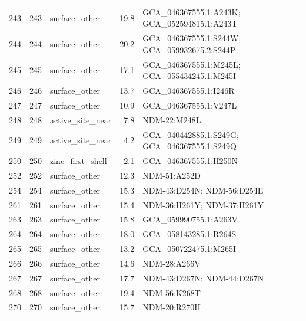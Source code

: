 \begin{longtable}{rrlrl}
243&243&surface\_other&19.8&GCA\_046367555.1:A243K; GCA\_052594815.1:A243T\\
244&244&surface\_other&20.2&GCA\_046367555.1:S244W; GCA\_059932675.2:S244P\\
245&245&surface\_other&17.1&GCA\_046367555.1:M245L; GCA\_055434245.1:M245I\\
246&246&surface\_other&13.7&GCA\_046367555.1:I246R\\
247&247&surface\_other&10.9&GCA\_046367555.1:V247L\\
248&248&active\_site\_near&7.8&NDM-22:M248L\\
249&249&active\_site\_near&4.2&GCA\_040442885.1:S249G; GCA\_046367555.1:S249Q\\
250&250&zinc\_first\_shell&2.1&GCA\_046367555.1:H250N\\
252&252&surface\_other&12.3&NDM-51:A252D\\
254&254&surface\_other&15.3&NDM-43:D254N; NDM-56:D254E\\
261&261&surface\_other&15.4&NDM-36:H261Y; NDM-37:H261Y\\
263&263&surface\_other&15.8&GCA\_059990755.1:A263V\\
264&264&surface\_other&18.0&GCA\_058143285.1:R264S\\
265&265&surface\_other&13.2&GCA\_050722475.1:M265I\\
266&266&surface\_other&14.6&NDM-28:A266V\\
267&267&surface\_other&17.7&NDM-43:D267N; NDM-44:D267N\\
268&268&surface\_other&19.4&NDM-56:K268T\\
270&270&surface\_other&15.7&NDM-20:R270H\\
\hline\end{longtable}
